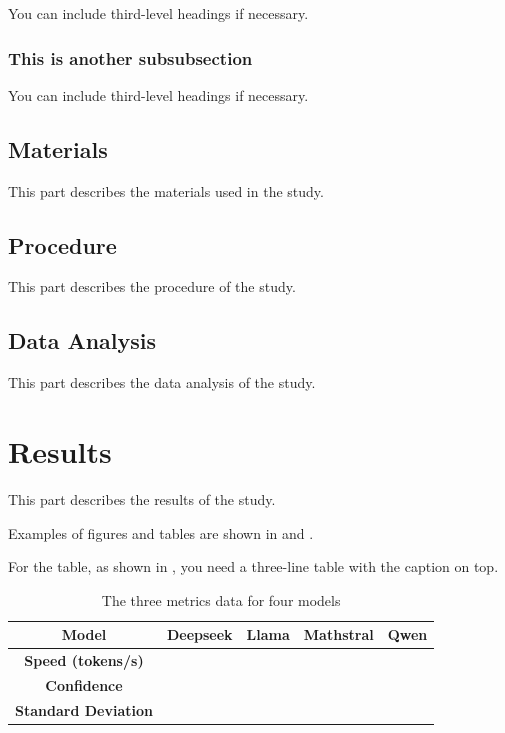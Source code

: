 \documentclass[12pt]{article}
\begin{document}
\begin{doublespace}
You can include third-level headings if necessary.

\subsubsection{This is another subsubsection}

You can include third-level headings if necessary.

\subsection{Materials}

This part describes the materials used in the study.

\subsection{Procedure}

This part describes the procedure of the study.

\subsection{Data Analysis}

This part describes the data analysis of the study.

\section{Results}

This part describes the results of the study.

Examples of figures and tables are shown in  and .

For the table, as shown in , you need a three-line table with the caption on top.

{
\begin{table}[H]
    \centering
    \caption{The three metrics data for four models}
    \begin{tabular}{c*{4}{>{\centering\arraybackslash}p{1.7cm}}}
    \Xhline{1.2pt}
        \textbf{Model} & \textbf{Deepseek} & \textbf{Llama} & \textbf{Mathstral} & \textbf{Qwen} \\ \hline
        \textbf{Speed (tokens/s)} & 44.3422 & 38.8985 & 33.6797 & 41.4418 \\ 
        \textbf{Confidence} & 0.9193 & 0.972 & 0.9551 & 0.9753 \\ 
        \textbf{Standard Deviation} & 0.92956 & 0.828484 & 0.87568 & 0.45489 \\ \hline
    \end{tabular}
    \label{Tab:metrics}
\end{table}}


\end{doublespace}
\end{document}

